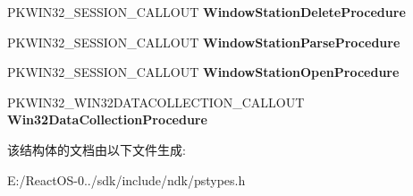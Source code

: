 \begin{DoxyCompactItemize}
P\+K\+W\+I\+N32\+\_\+\+S\+E\+S\+S\+I\+O\+N\+\_\+\+C\+A\+L\+L\+O\+UT {\bfseries Window\+Station\+Delete\+Procedure}
\item 
\mbox{\label{struct___w_i_n32___c_a_l_l_o_u_t_s___f_p_n_s_a45279457816f925ab32dd41957b20838}} 
P\+K\+W\+I\+N32\+\_\+\+S\+E\+S\+S\+I\+O\+N\+\_\+\+C\+A\+L\+L\+O\+UT {\bfseries Window\+Station\+Parse\+Procedure}
\item 
\mbox{\label{struct___w_i_n32___c_a_l_l_o_u_t_s___f_p_n_s_ab4101b8ae1af9cb6c9e44eb9a7644a42}} 
P\+K\+W\+I\+N32\+\_\+\+S\+E\+S\+S\+I\+O\+N\+\_\+\+C\+A\+L\+L\+O\+UT {\bfseries Window\+Station\+Open\+Procedure}
\item 
\mbox{\label{struct___w_i_n32___c_a_l_l_o_u_t_s___f_p_n_s_a6518bb2b69dbc9f98062d352a7d24a0f}} 
P\+K\+W\+I\+N32\+\_\+\+W\+I\+N32\+D\+A\+T\+A\+C\+O\+L\+L\+E\+C\+T\+I\+O\+N\+\_\+\+C\+A\+L\+L\+O\+UT {\bfseries Win32\+Data\+Collection\+Procedure}
\end{DoxyCompactItemize}


该结构体的文档由以下文件生成\+:\begin{DoxyCompactItemize}
\item 
E\+:/\+React\+O\+S-\/0../sdk/include/ndk/pstypes.\+h\end{DoxyCompactItemize}
